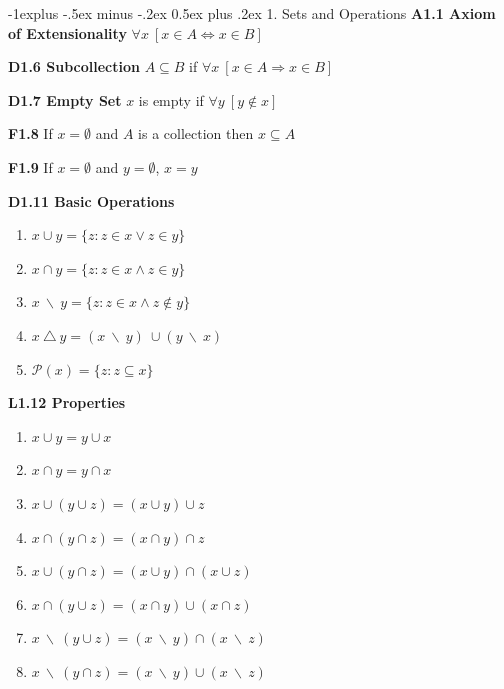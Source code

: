 \documentclass[10pt, landscape]{article}
\makeatletter
\renewcommand{\section}{\@startsection{section}{1}{0mm}%
                                {-1ex plus -.5ex minus -.2ex}%
                                {0.5ex plus .2ex}%
                                {\normalfont\large\bfseries}}
\renewcommand{\section}{\@startsection{section}{2}{0mm}%
                                {-1explus -.5ex minus -.2ex}%
                                {0.5ex plus .2ex}%
                                {\normalfont\normalsize\bfseries}}
\makeatother
\begin{document}
\raggedright
\footnotesize
\begin{multicols*}{3}

\setlength{\columnseprule}{0.25pt}
\setlength{\premulticols}{1pt}
\setlength{\postmulticols}{1pt}
\setlength{\multicolsep}{1pt}
\setlength{\columnsep}{2pt}

\begin{center}
\end{center}

\section{1. Sets and Operations}
\textbf{A1.1 Axiom of Extensionality} $\forall x\ [x \in A \Longleftrightarrow x \in B]$

\textbf{D1.6 Subcollection} $A \subseteq B$ if $\forall x\ [x \in A \Rightarrow x \in B]$

\textbf{D1.7 Empty Set} $x$ is empty if $\forall y\ [y \notin x]$

\textbf{F1.8} If $x = \emptyset$ and $A$ is a collection then $x \subseteq A$

\textbf{F1.9} If $x=\emptyset$ and $y=\emptyset$, $x=y$

\textbf{D1.11 Basic Operations}
\begin{enumerate}
    \item $x \cup y = \{z : z\in x \lor z \in y\}$
    \item $x \cap y = \{z : z\in x \land z \in y\}$
    \item $x\ \backslash\ y = \{z : z\in x \land z \notin y\}$
    \item $x\ \triangle\ y = (x\ \backslash \ y)\ \cup (y\ \backslash \ x)$
    \item $\mathcal{P}(x)=\{z:z\subseteq x\}$
\end{enumerate}

\textbf{L1.12 Properties}
\begin{enumerate}
    \item $x \cup y = y \cup x$
    \item $x \cap y = y \cap x$
    \item $x \cup (y \cup z) = (x \cup y) \cup z$
    \item $x \cap (y \cap z) = (x \cap y) \cap z$
    \item $x \cup (y \cap z) = (x \cup y) \cap (x \cup z)$
    \item $x \cap (y \cup z) = (x \cap y) \cup (x \cap z)$
    \item $x\ \backslash\ (y \cup z) = (x\ \backslash\ y) \cap (x\ \backslash\ z)$
    \item $x\ \backslash\ (y \cap z) = (x\ \backslash\ y) \cup (x\ \backslash\ z)$
\end{enumerate}


\end{multicols*}
\end{document}
